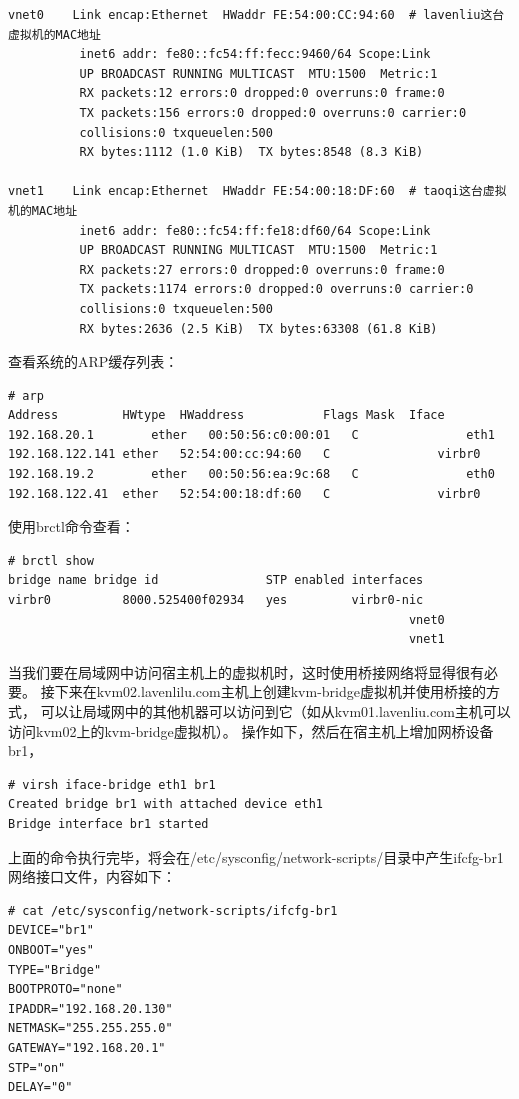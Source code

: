 \begin{verbatim}
vnet0    Link encap:Ethernet  HWaddr FE:54:00:CC:94:60  # lavenliu这台虚拟机的MAC地址
          inet6 addr: fe80::fc54:ff:fecc:9460/64 Scope:Link
          UP BROADCAST RUNNING MULTICAST  MTU:1500  Metric:1
          RX packets:12 errors:0 dropped:0 overruns:0 frame:0
          TX packets:156 errors:0 dropped:0 overruns:0 carrier:0
          collisions:0 txqueuelen:500 
          RX bytes:1112 (1.0 KiB)  TX bytes:8548 (8.3 KiB)

vnet1    Link encap:Ethernet  HWaddr FE:54:00:18:DF:60  # taoqi这台虚拟机的MAC地址
          inet6 addr: fe80::fc54:ff:fe18:df60/64 Scope:Link
          UP BROADCAST RUNNING MULTICAST  MTU:1500  Metric:1
          RX packets:27 errors:0 dropped:0 overruns:0 frame:0
          TX packets:1174 errors:0 dropped:0 overruns:0 carrier:0
          collisions:0 txqueuelen:500 
          RX bytes:2636 (2.5 KiB)  TX bytes:63308 (61.8 KiB)
\end{verbatim}

查看系统的ARP缓存列表：

\begin{verbatim}
# arp
Address			HWtype  HWaddress			Flags Mask	Iface
192.168.20.1		ether   00:50:56:c0:00:01	C 				eth1
192.168.122.141	ether   52:54:00:cc:94:60	C				virbr0
192.168.19.2		ether   00:50:56:ea:9c:68	C				eth0
192.168.122.41	ether   52:54:00:18:df:60	C				virbr0
\end{verbatim}

使用brctl命令查看：

\begin{verbatim}
# brctl show
bridge name	bridge id				STP enabled	interfaces
virbr0			8000.525400f02934	yes			virbr0-nic
														vnet0
														vnet1
\end{verbatim}

当我们要在局域网中访问宿主机上的虚拟机时，这时使用桥接网络将显得很有必要。
接下来在kvm02.lavenlilu.com主机上创建kvm-bridge虚拟机并使用桥接的方式，
可以让局域网中的其他机器可以访问到它（如从kvm01.lavenliu.com主机可以访问kvm02上的kvm-bridge虚拟机）。
操作如下，然后在宿主机上增加网桥设备br1，

\begin{verbatim}
# virsh iface-bridge eth1 br1
Created bridge br1 with attached device eth1
Bridge interface br1 started
\end{verbatim}

上面的命令执行完毕，将会在/etc/sysconfig/network-scripts/目录中产生ifcfg-br1网络接口文件，内容如下：

\begin{verbatim}
# cat /etc/sysconfig/network-scripts/ifcfg-br1
DEVICE="br1"
ONBOOT="yes"
TYPE="Bridge"
BOOTPROTO="none"
IPADDR="192.168.20.130"
NETMASK="255.255.255.0"
GATEWAY="192.168.20.1"
STP="on"
DELAY="0"
\end{verbatim}

